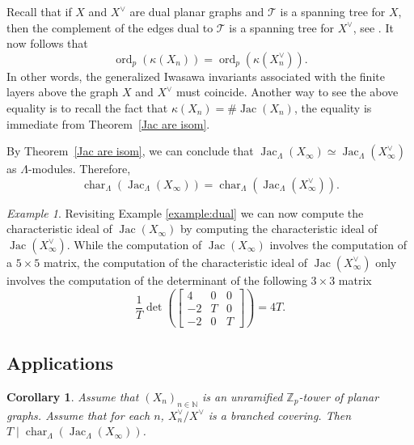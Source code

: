 \documentclass{amsart}
\newtheorem{corollary}[theorem]{Corollary}
\numberwithin{equation}{section}
\theoremstyle{remark}
\newtheorem{example}[theorem]{Example}
\newcommand{\Jac}{\operatorname{Jac}}
\newcommand{\ord}{\operatorname{ord}}
\newcommand{\Char}{\operatorname{char}}
\newcommand{\Z}{\mathbb{Z}}
\theoremstyle{plain} %
\begin{document}
Recall that if $X$ and $X^\vee$ are dual planar graphs and $\mathcal{T}$ is a spanning tree for $X$, then the complement of the edges dual to $\mathcal{T}$ is a spanning tree for $X^\vee$, see \cite{biggs1971spanning}.
It now follows that
\[
\ord_p(\kappa(X_n)) = \ord_p(\kappa(X_n^\vee)).
\]
In other words, the generalized Iwasawa invariants associated with the finite layers above the graph $X$ and $X^\vee$ must coincide.
Another way to see the above equality is to recall the fact that $\kappa(X_n) = \# \Jac(X_n)$, the equality is immediate from Theorem~\ref{Jac are isom}.


By Theorem~\ref{Jac are isom}, we can conclude that $\Jac_{\Lambda}(X_\infty) \simeq \Jac_{\Lambda}(X_\infty^\vee)$ as $\Lambda$-modules.
Therefore,
\[
{\Char}_{\Lambda}(\Jac_{\Lambda}(X_\infty)) = {\Char}_{\Lambda}(\Jac_{\Lambda}(X_\infty^\vee)).
\]

\begin{example}
Revisiting Example \ref{example:dual} we can now compute the characteristic ideal of $\Jac(X_\infty)$ by computing the characteristic ideal of $\Jac(X_\infty^\vee)$.
While the computation of $\Jac(X_\infty)$ involves the computation of a $5\times 5$ matrix, the computation of the characteristic ideal of $\Jac(X_\infty^\vee)$ only involves the computation of the determinant of the following $3\times 3$ matrix
\[
\frac{1}{T}\det\left(\begin{bmatrix}
        4&0&0\\
        -2&T&0\\
        -2&0&T
    \end{bmatrix}\right)=4T.
\]
\end{example}


\subsection{Applications}

\label{sec app}

\begin{corollary}
\label{cor:app}
Assume that $(X_n)_{n\in \mathbb{N}}$ is an \emph{unramified} $\Z_p$-tower of planar graphs.
Assume that for each $n$, $X_n^\vee/X^\vee$ is a branched covering. 
Then $T\mid \Char_\Lambda({\Jac}_\Lambda(X_\infty))$.
\end{corollary}
\end{document}
